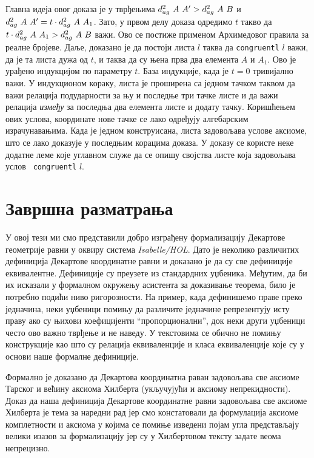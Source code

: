 Главна идеја овог доказа је у тврђењима $d^2_{ag}\ A\ A' >
d^2_{ag}\ A\ B$ и $d^2_{ag}\ A\ A' = t\cdot
d^2_{ag}\ A\ A_1$. Зато, у првом делу доказа одредимо $t$ такво да
$t\cdot d^2_{ag}\ A\ A_1 > d^2_{ag}\ A\ B$ важи. Ово се постиже
применом Архимедовог правила за реалне бројеве. Даље, доказано је да
постоји листа $l$ таква да {\tt congruentl} $l$ важи, да је та листа
дужа од $t$, и таква да су њена прва два елемента $A$ и $A_1$. Ово је
урађено индукцијом по параметру $t$. База индукције, када је $t = 0$
тривијално важи. У индукционом кораку, листа је проширена са једном
тачком таквом да важи релација подударности за њу и последње три тачке
листе и да важи релација \emph{између} за последња два елемента листе
и додату тачку. Коришћењем ових услова, координате нове тачке се лако
одређују алгебарским израчунавањима. Када је једном конструисана,
листа задовољава услове аксиоме, што се лако доказује у последњим
корацима доказа. У доказу се користе неке додатне леме које углавном
служе да се опишу својства листе која задовољава услов {\tt
  congruentl} $l$.

\section{Завршна разматрања}
\label{sec:concl}

У овој тези ми смо представили добро изграђену формализацију Декартове
геометрије равни у оквиру система \emph{Isabelle/HOL}. Дато је
неколико различитих дефиниција Декартове координатне равни и доказано
је да су све дефиниције еквивалентне. Дефиниције су преузете из
стандардних уџбеника.  Међутим, да би их исказали у формалном окружењу
асистента за доказивање теорема, било је потребно подићи ниво
ригорозности. На пример, када дефинишемо праве преко једначина, неки
уџбеници помињу да различите једначине репрезентују исту праву ако су
њихови коефицијенти ``пропорционални'', док неки други уџбеници често
ово важно тврђење и не наведу. У текстовима се обично не помињу
конструкције као што су релација еквиваленције и класа еквиваленције
које су у основи наше формалне дефиниције.

Формално је доказано да Декартова координатна раван задовољава све
аксиоме Тарског и већину аксиома Хилберта (укључујући и аксиому
непрекидности).  Доказ да наша дефиниција Декартове координатне равни
задовољава све аксиоме Хилберта је тема за наредни рад јер смо
констатовали да формулација аксиоме комплетности и аксиома у којима се
помиње изведени појам угла представљају велики изазов за формализацију
јер су у Хилбертовом тексту задате веома непрецизно.

